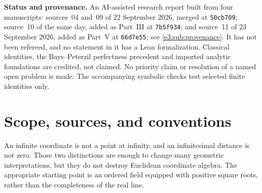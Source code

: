 \documentclass[11pt,letterpaper]{article}
\numberwithin{equation}{section}
\theoremstyle{definition}
\theoremstyle{remark}
\newcommand{\No}{\mathbf{No}}
\newcommand{\SO}{\operatorname{SO}}
\newcommand{\SU}{\operatorname{SU}}
\newcommand{\sG}{\mathsf G}
\begin{document}
\begin{titlepage}
\begin{minipage}{0.94\textwidth}
\begin{abstract}
Part~III refines Part~II over a real closed field with its natural valuation.
Single commutators of two valuation-cut subgroups fill exactly the cut
subgroup of the summed cut, and the normal closure of an infinitesimal rotation
is the full subgroup of its depth. Hence the proper normal subgroups of
$\SO(3,F)$ are classified by valuation cuts. Principal subgroups have an explicit
perfect residual, which is trivial exactly at order units. Over the full class
$\No$, every class homomorphism from $\SO(3,\No)$, from $\SO(n,\No)$ with
$n\ge3$, or from $\SU(n,\No[i])$ with $n\ge2$ to a set-sized group factors
through standard part. For the circle this fails.

Part~V treats every connected real linear algebraic group $\sG$ with compact
connected real points. Exactly the derived infinitesimal subgroup of $\sG(\No)$ is
invisible to set-sized groups, so a universal set-sized quotient exists exactly
when $\sG$ is semisimple, and it is then standard part.

The rotation algebra shared by Parts~I and~II is printed once in Part~I: axes,
Rodrigues, quaternions, and the Cayley chart. The quaternion double cover is
cited from the collection's surquaternion report.
\end{abstract}
\end{minipage}
\vfill
\begin{minipage}{0.94\textwidth}\small
\textbf{Status and provenance.} An AI-assisted research report built from four
manuscripts: sources~04 and~09 of 22 September 2026, merged at
\texttt{50cb709}; source~10 of the same day, added as Part~III at
\texttt{7b5f934}; and source~11 of 23 September 2026, added as Part~V at
\texttt{66d7e55}; see \cref{e3:sub:provenance}. It has not been refereed, and no statement in it has a
Lean formalization. Classical identities, the Bays--Peterzil perfectness
precedent and imported analytic foundations are credited, not claimed. No
priority claim or resolution of a named open problem is made. The accompanying
symbolic checks test selected finite identities only.
\end{minipage}
\end{titlepage}
\hypersetup{pageanchor=true}
\tableofcontents
\clearpage

\section{Scope, sources, and conventions}\label{e3:sec:scope}

An infinite coordinate is not a point at infinity, and an infinitesimal distance
is not zero. Those two distinctions are enough to change many geometric
interpretations, but they do not destroy Euclidean coordinate algebra. The
appropriate starting point is an ordered field equipped with positive square
roots, rather than the completeness of the real line.
\end{document}
